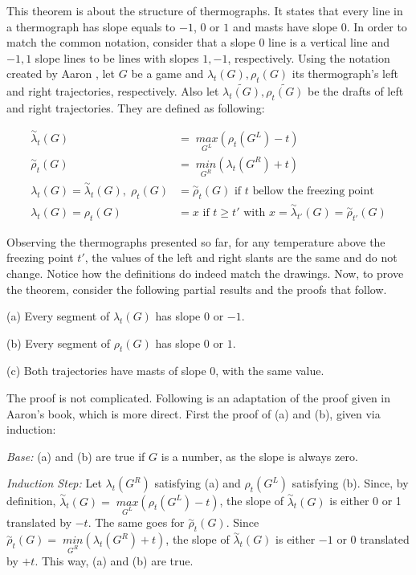 This theorem is about the structure of thermographs. It states that every line in a thermograph has slope equals to ${-}1$, $0$ or $1$ and masts have slope 0. In order to match the common notation, consider that a slope 0 line is a vertical line and ${-1},1$ slope lines to be lines with slopes $1,{-}1$, respectively. Using the notation created by Aaron \cite{CGT}, let $G$ be a game and $\lambda_t(G), \rho_t(G)$ its thermograph's left and right trajectories, respectively. Also let $\tilde{\lambda_t(G)}, \tilde{\rho_t(G)}$ be the drafts of left and right trajectories. They are defined as following:

\begin{align*}
\overset{\sim}{\lambda}_t(G) &=\; \underset{G^L}{max}(\rho_t(G^L)- t)\\
\overset{\sim}{\rho}_t(G) &=\; \underset{G^R}{min}(\lambda_t(G^R) + t)\\
\lambda_t(G) = \overset{\sim}{\lambda}_t(G),\;\rho_t(G) &= \overset{\sim}{\rho}_t(G)\text{ if $t$ bellow the freezing point} \\
\lambda_t(G) = \rho_t(G) &= x \text{ if $t \ge t'$ with } x = \overset{\sim}{\lambda}_{t'}(G) = \overset{\sim}{\rho}_{t'}(G)
\end{align*}

Observing the thermographs presented so far, for any temperature above the freezing point $t'$, the values of the left and right slants are the same and do not change. Notice how the definitions do indeed match the drawings. Now, to prove the theorem, consider the following partial results and the proofs that follow.

\hspace{1cm}(a) Every segment of $\lambda_t(G)$ has slope 0 or ${-}1$.

\hspace{1cm}(b) Every segment of $\rho_t(G)$ has slope 0 or $1$.

\hspace{1cm}(c) Both trajectories have masts of slope 0, with the same value.

The proof is not complicated. Following is an adaptation of the proof given in Aaron's book, which is more direct. First the proof of (a) and (b), given via induction:

\textit{Base:} (a) and (b) are true if $G$ is a number, as the slope is always zero.

\textit{Induction Step:} Let $\lambda_t(G^R)$ satisfying (a) and $\rho_t(G^L)$ satisfying (b). Since, by definition, \mbox{$\overset{\sim}{\lambda}_t(G) =\; \underset{G^L}{max}(\rho_t(G^L)- t)$}, the slope of $\overset{\sim}{\lambda}_t(G)$ is either 0 or 1 translated by ${-}t$. The same goes for $\overset{\sim}{\rho}_t(G)$. Since \mbox{$\overset{\sim}{\rho}_t(G) =\; \underset{G^R}{min}(\lambda_t(G^R) + t)$}, the slope of $\overset{\sim}{\lambda}_t(G)$ is either ${-}1$ or 0 translated by ${+}t$. This way, (a) and (b) are true.

